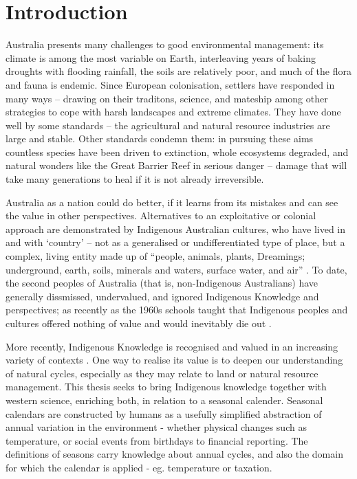 \chapter{Introduction}
\label{ch:introduction}

Australia presents many challenges to good environmental management: its
climate is among the most variable on Earth, interleaving years of baking
droughts with flooding rainfall, the soils are relatively poor, and much of
the flora and fauna is endemic.
%
Since European colonisation, settlers have responded in many ways --
drawing on their traditons, science, and mateship among other strategies to cope
with harsh landscapes and extreme climates.
%
They have done well by some standards -- the agricultural and natural
resource industries are large and stable.  Other standards condemn
them: in pursuing these aims countless species have been driven to extinction,
whole ecosystems degraded, and natural wonders like the Great Barrier Reef
in serious danger -- damage that will take many generations to heal if it is
not already irreversible.

Australia as a nation could do better, if it learns from its mistakes and can
see the value in other perspectives.  Alternatives to an exploitative or
colonial approach are demonstrated by Indigenous Australian cultures, who
have lived in and with `country' -- not as a generalised or undifferentiated
type of place, but a complex, living entity made up of ``people, animals,
plants, Dreamings; underground, earth, soils, minerals and waters, surface
water, and air'' \citep{birdrose1996}.
%
To date, the second peoples of Australia (that is, non-Indigenous Australians)
have generally dissmissed, undervalued, and ignored Indigenous Knowledge
and perspectives; as recently as the 1960s schools taught that Indigenous
peoples and cultures offered nothing of value and would inevitably die out
\citep{flannery1994}.


More recently, Indigenous Knowledge is recognised and valued in an
increasing variety of contexts \citep[eg.][]{petheram2010,cochran2015,
berkes2012}.  One way to realise its value is to deepen our understanding
of natural cycles, especially as they may relate to land or natural resource
management.  This thesis seeks to bring Indigenous knowledge together with
western science, enriching both, in relation to a seasonal calender.
%
Seasonal calendars are constructed by humans as a usefully simplified
abstraction of annual variation in the environment - whether physical
changes such as temperature, or social events from birthdays to financial
reporting.  The definitions of seasons carry knowledge about annual cycles,
and also the domain for which the calendar is applied - eg. temperature
or taxation.

